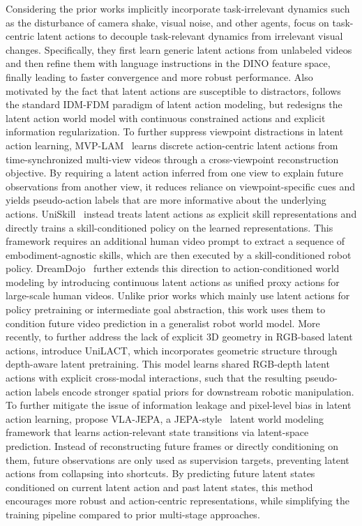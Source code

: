 \documentclass[Afour,sageh,times]{sagej}
\begin{document}
Considering the prior works implicitly incorporate task-irrelevant dynamics such as the disturbance of camera shake, visual noise, and other agents, \cite{bu2025univla} focus on task-centric latent actions to decouple task-relevant dynamics from irrelevant visual changes. Specifically, they first learn generic latent actions from unlabeled videos and then refine them with language instructions in the DINO feature space, finally leading to faster convergence and more robust performance. Also motivated by the fact that latent actions are susceptible to distractors, \cite{garrido2026learning} follows the standard IDM-FDM paradigm of latent action modeling, but redesigns the latent action world model with continuous constrained actions and explicit information regularization. To further suppress viewpoint distractions in latent action learning, MVP-LAM~\citep{lee2026mvp} learns discrete action-centric latent actions from time-synchronized multi-view videos through a cross-viewpoint reconstruction objective. By requiring a latent action inferred from one view to explain future observations from another view, it reduces reliance on viewpoint-specific cues and yields pseudo-action labels that are more informative about the underlying actions. UniSkill~\citep{kim2025uniskill} instead treats latent actions as explicit skill representations and directly trains a skill-conditioned policy on the learned representations. This framework requires an additional human video prompt to extract a sequence of embodiment-agnostic skills, which are then executed by a skill-conditioned robot policy. DreamDojo~\citep{gao2026dreamdojo} further extends this direction to action-conditioned world modeling by introducing continuous latent actions as unified proxy actions for large-scale human videos. Unlike prior works which mainly use latent actions for policy pretraining or intermediate goal abstraction, this work uses them to condition future video prediction in a generalist robot world model. More recently, to further address the lack of explicit 3D geometry in RGB-based latent actions, \cite{govind2026unilact} introduce UniLACT, which incorporates geometric structure through depth-aware latent pretraining. This model learns shared RGB-depth latent actions with explicit cross-modal interactions, such that the resulting pseudo-action labels encode stronger spatial priors for downstream robotic manipulation. To further mitigate the issue of information leakage and pixel-level bias in latent action learning, \cite{sun2026vla} propose VLA-JEPA, a JEPA-style~\citep{assran2025v} latent world modeling framework that learns action-relevant state transitions via latent-space prediction. Instead of reconstructing future frames or directly conditioning on them, future observations are only used as supervision targets, preventing latent actions from collapsing into shortcuts. By predicting future latent states conditioned on current latent action and past latent states, this method encourages more robust and action-centric representations, while simplifying the training pipeline compared to prior multi-stage approaches.
\end{document}
